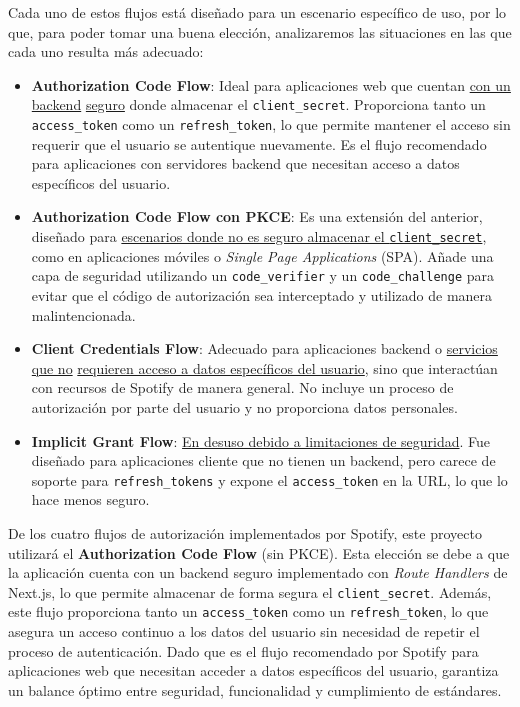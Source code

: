 Cada uno de estos flujos está diseñado para un escenario específico de uso, por lo que, para poder tomar una buena elección, analizaremos las situaciones en las que cada uno resulta más adecuado:

\begin{itemize}
    \item \textbf{Authorization Code Flow}: Ideal para aplicaciones web que cuentan \underline{con un backend} \underline{seguro} donde almacenar el \texttt{client\_secret}. Proporciona tanto un \texttt{access\_token} como un \texttt{refresh\_token}, lo que permite mantener el acceso sin requerir que el usuario se autentique nuevamente. Es el flujo recomendado para aplicaciones con servidores backend que necesitan acceso a datos específicos del usuario.

    \item \textbf{Authorization Code Flow con PKCE}: Es una extensión del anterior, diseñado para \underline{escenarios donde no es seguro almacenar el \texttt{client\_secret}}, como en aplicaciones móviles o \textit{Single Page Applications} (SPA). Añade una capa de seguridad utilizando un \texttt{code\_verifier} y un \texttt{code\_challenge} para evitar que el código de autorización sea interceptado y utilizado de manera malintencionada.

    \item \textbf{Client Credentials Flow}: Adecuado para aplicaciones backend o \underline{servicios que no} \underline{requieren acceso a datos específicos del usuario}, sino que interactúan con recursos de Spotify de manera general. No incluye un proceso de autorización por parte del usuario y no proporciona datos personales.

    \item \textbf{Implicit Grant Flow}: \underline{En desuso debido a limitaciones de seguridad}. Fue diseñado para aplicaciones cliente que no tienen un backend, pero carece de soporte para \texttt{refresh\_tokens} y expone el \texttt{access\_token} en la URL, lo que lo hace menos seguro.
\end{itemize}

De los cuatro flujos de autorización implementados por Spotify, este proyecto utilizará el \textbf{Authorization Code Flow} (sin PKCE). Esta elección se debe a que la aplicación cuenta con un backend seguro implementado con \textit{Route Handlers} de Next.js, lo que permite almacenar de forma segura el \texttt{client\_secret}. Además, este flujo proporciona tanto un \texttt{access\_token} como un \texttt{refresh\_token}, lo que asegura un acceso continuo a los datos del usuario sin necesidad de repetir el proceso de autenticación. Dado que es el flujo recomendado por Spotify para aplicaciones web que necesitan acceder a datos específicos del usuario, garantiza un balance óptimo entre seguridad, funcionalidad y cumplimiento de estándares.


